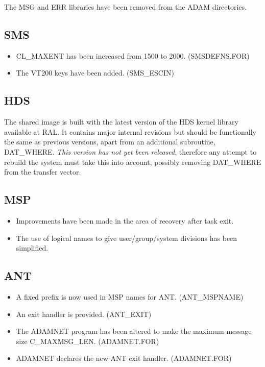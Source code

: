 The MSG and ERR libraries have been removed from the ADAM directories.

\subsection{SMS}
\begin{itemize}
\item CL\_MAXENT has been increased from 1500 to 2000. (SMSDEFNS.FOR)
\item The VT200 keys have been added. (SMS\_ESCIN)
\end{itemize}

\subsection{HDS}
The shared image is built with the latest version of the HDS kernel library
available at RAL.
It contains major internal revisions but should be functionally the same as
previous versions, apart from an additional subroutine, DAT\_WHERE.
{\em This version has not yet been released}, therefore any attempt to rebuild
the system must take this into account, possibly removing DAT\_WHERE from the
transfer vector.

\subsection{MSP}
\begin{itemize}
\item Improvements have been made in the area of recovery after task exit.
\item The use of logical names to give user/group/system divisions has been
simplified.
\end{itemize}

\subsection{ANT}
\begin{itemize}
\item A fixed prefix is now used in MSP names for ANT. (ANT\_MSPNAME)
\item An exit handler is provided. (ANT\_EXIT)
\item The ADAMNET program has been altered to make the maximum message size
C\-\_MAXMSG\-\_LEN. (ADAMNET.FOR)
\item ADAMNET declares the new ANT exit handler. (ADAMNET.FOR)
\end{itemize}

